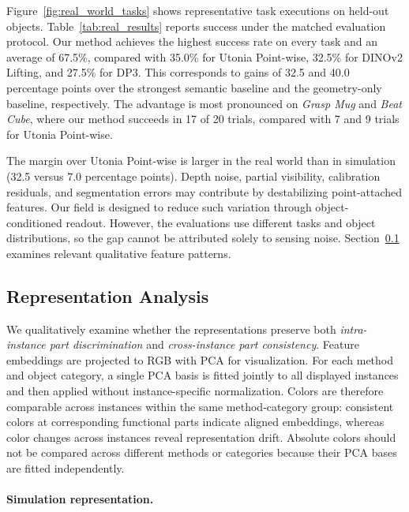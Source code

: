 Figure~\ref{fig:real_world_tasks} shows representative task executions on held-out objects. Table~\ref{tab:real_results} reports success under the matched evaluation protocol. Our method achieves the highest success rate on every task and an average of 67.5\%, compared with 35.0\% for Utonia Point-wise, 32.5\% for DINOv2 Lifting, and 27.5\% for DP3. This corresponds to gains of 32.5 and 40.0 percentage points over the strongest semantic baseline and the geometry-only baseline, respectively. The advantage is most pronounced on \emph{Grasp Mug} and \emph{Beat Cube}, where our method succeeds in 17 of 20 trials, compared with 7 and 9 trials for Utonia Point-wise.

The margin over Utonia Point-wise is larger in the real world than in simulation (32.5 versus 7.0 percentage points). Depth noise, partial visibility, calibration residuals, and segmentation errors may contribute by destabilizing point-attached features. Our field is designed to reduce such variation through object-conditioned readout. However, the evaluations use different tasks and object distributions, so the gap cannot be attributed solely to sensing noise. Section~\ref{sec:representation_stability} examines relevant qualitative feature patterns.


\subsection{Representation Analysis}
\label{sec:representation_stability}

We qualitatively examine whether the representations preserve both \emph{intra-instance part discrimination} and \emph{cross-instance part consistency}. Feature embeddings are projected to RGB with PCA for visualization. For each method and object category, a single PCA basis is fitted jointly to all displayed instances and then applied without instance-specific normalization. Colors are therefore comparable across instances within the same method-category group: consistent colors at corresponding functional parts indicate aligned embeddings, whereas color changes across instances reveal representation drift. Absolute colors should not be compared across different methods or categories because their PCA bases are fitted independently.


\paragraph{Simulation representation.}


